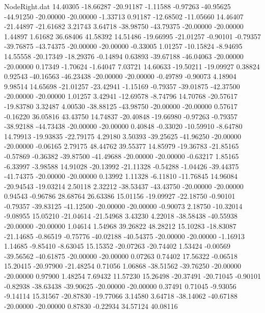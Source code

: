 \begin{filecontents}{NodeRight.dat}
  14.40305  -18.66287  -20.91187    -1.11588   -0.97263  -40.95625  -44.91250  -20.00000  -20.00000   -1.33713    0.91187  -12.68502  -11.05660
  14.46407  -21.44897  -21.61682     3.21743    3.64718  -38.98750  -43.79375  -20.00000  -20.00000    1.44897    1.61682   36.68406   41.58392
  14.51486  -19.66995  -21.01257    -0.90101   -0.79357  -39.76875  -43.74375  -20.00000  -20.00000   -0.33005    1.01257  -10.15824   -8.94695
  14.55558  -20.17349  -18.29376    -0.14894    0.63893  -39.67188  -46.04063  -20.00000  -20.00000    0.17349   -1.70624   -1.64047    7.03721
  14.60633  -19.50211  -19.09927     0.38824    0.92543  -40.16563  -46.23438  -20.00000  -20.00000   -0.49789   -0.90073    4.18904    9.98514
  14.65698  -21.01257  -23.42941    -1.15169   -0.79357  -39.01875  -42.37500  -20.00000  -20.00000    1.01257    3.42941  -12.69578   -8.74796
  14.70768  -20.57617  -19.83780     3.32487    4.00530  -38.88125  -43.98750  -20.00000  -20.00000    0.57617   -0.16220   36.05816   43.43750
  14.74837  -20.40848  -19.66980    -0.97263   -0.79357  -38.92188  -44.73438  -20.00000  -20.00000    0.40848   -0.33020  -10.59910   -8.64780
  14.79913  -19.93835  -22.79175     4.29180    3.50393  -39.25625  -41.96250  -20.00000  -20.00000   -0.06165    2.79175   48.44762   39.55377
  14.85979  -19.36783  -21.85165    -0.57869   -0.36382  -39.87500  -41.49688  -20.00000  -20.00000   -0.63217    1.85165   -6.33997   -3.98588
  14.91028  -20.13992  -21.11328    -0.54288   -1.04426  -39.44375  -41.74375  -20.00000  -20.00000    0.13992    1.11328   -6.11810  -11.76845
  14.96084  -20.94543  -19.03214     2.50118    2.32212  -38.53437  -43.43750  -20.00000  -20.00000    0.94543   -0.96786   28.68764   26.63386
  15.01156  -19.09927  -22.18750    -0.90101   -0.79357  -39.83125  -41.12500  -20.00000  -20.00000   -0.90073    2.18750  -10.32014   -9.08955
  15.05210  -21.04614  -21.54968     3.43230    4.22018  -38.58438  -40.55938  -20.00000  -20.00000    1.04614    1.54968   39.26822   48.28212
  15.10283  -18.83087  -21.14685    -0.86519   -0.75776  -40.02188  -40.54375  -20.00000  -20.00000   -1.16913    1.14685   -9.85410   -8.63045
  15.15352  -20.07263  -20.74402     1.53424   -0.00569  -39.56562  -40.61875  -20.00000  -20.00000    0.07263    0.74402   17.56322   -0.06518
  15.20415  -20.97900  -21.48254     0.71056    1.06868  -38.51562  -39.76250  -20.00000  -20.00000    0.97900    1.48254    7.69432   11.57230
  15.26498  -20.37491  -20.71045    -0.90101   -0.82938  -38.63438  -39.90625  -20.00000  -20.00000    0.37491    0.71045   -9.93056   -9.14114
  15.31567  -20.87830  -19.77066     3.14580    3.64718  -38.14062  -40.67188  -20.00000  -20.00000    0.87830   -0.22934   34.57124   40.08116

\end{filecontents}
